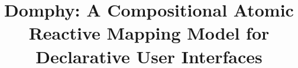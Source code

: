 \documentclass[10pt,conference]{IEEEtran}
\begin{document}
\title{Domphy: A Compositional Atomic Reactive Mapping Model for Declarative User Interfaces}

\author{
}

\maketitle










\end{document}

